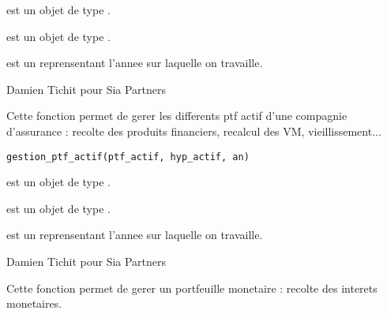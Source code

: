 \documentclass[a4paper]{book}
\begin{document}
%
\begin{Arguments}
\begin{ldescription}
\item[\code{obligation}] est un objet de type .

\item[\code{hyp\_actif}] est un objet de type .

\item[\code{an}] est un  reprensentant l'annee sur laquelle on travaille.
\end{ldescription}
\end{Arguments}
%
\begin{Author}\relax
Damien Tichit pour Sia Partners
\end{Author}
%
\begin{Description}\relax
Cette fonction permet de gerer les differents ptf actif d'une compagnie d'assurance : recolte des produits financiers, recalcul des VM, vieillissement...
\end{Description}
%
\begin{Usage}
\begin{verbatim}
gestion_ptf_actif(ptf_actif, hyp_actif, an)
\end{verbatim}
\end{Usage}
%
\begin{Arguments}
\begin{ldescription}
\item[\code{ptf\_actif}] est un objet de type .

\item[\code{hyp\_actif}] est un objet de type .

\item[\code{an}] est un  reprensentant l'annee sur laquelle on travaille.
\end{ldescription}
\end{Arguments}
%
\begin{Author}\relax
Damien Tichit pour Sia Partners
\end{Author}
%
\begin{Description}\relax
Cette fonction permet de gerer un portfeuille monetaire : recolte des interets monetaires.
\end{Description}
\end{document}
